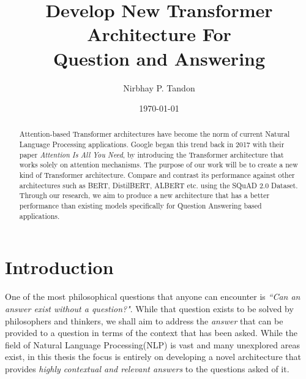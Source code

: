 \documentclass[a4paper,12pt]{report}
\begin{document}
    \title{Develop New Transformer Architecture For \\ Question and Answering}

    \author{Nirbhay P. Tandon}

    \date{\vfill \monthyeardate\today}
    \maketitle


    \cleardoublepage%
    \tableofcontents
    \newpage
    \listoffigures
    \listoftables
    
    \printnomenclature[1in]
	\begin{abstract}
		Attention-based Transformer architectures have become the norm of current Natural Language Processing applications. Google began this trend back in 2017 with their paper \textit{Attention Is All You Need}, by introducing the Transformer architecture that works solely on attention mechanisms. The purpose of our work will be to create a new kind of Transformer architecture. Compare and contrast its performance against other architectures such as BERT, DistilBERT, ALBERT etc. using the SQuAD 2.0 Dataset. Through our research, we aim to produce a new architecture that has a better performance than existing models specifically for Question Answering based applications.
	\end{abstract}
    \cleardoublepage%
    \chapter{\centering Introduction}\label{c1introduction}

    One of the most philosophical questions that anyone can encounter is \textit{``Can an answer exist without a question?"}. While that question exists to be solved by philosophers and thinkers, we shall aim to address the \textit{answer} that can be provided to a question in terms of the context that has been asked. While the field of Natural Language Processing(NLP) is vast and many unexplored areas exist, in this thesis the focus is entirely on developing a novel architecture that provides \textit{highly contextual and relevant answers} to the questions asked of it.
\end{document}

